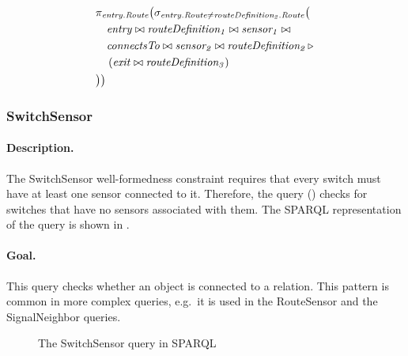 \begin{align*}
& \pi_{\mathit{entry.Route}} \big( \sigma_{\mathit{entry.Route} \neq \mathit{routeDefinition_2.Route}} \big( \\
& \quad \mathit{entry} \bowtie \mathit{routeDefinition_1} \bowtie \mathit{sensor_1} \bowtie \\
& \quad \mathit{connectsTo} \bowtie \mathit{sensor_2} \bowtie \mathit{routeDefinition_2} \, \triangleright \, \\
& \quad \left( \mathit{exit} \bowtie \mathit{routeDefinition_3} \right) \\
& \big) \big)
\end{align*}

\subsubsection{SwitchSensor}

\paragraph{Description.} The \textsf{SwitchSensor} well-formedness constraint requires that every switch must have at least one sensor connected to it. Therefore, the query () checks for switches that have no sensors associated with them. The SPARQL representation of the query is shown in .

\paragraph{Goal.} This query checks whether an object is connected to a relation. This pattern is common in more complex queries, e.g.\ it is used in the \textsf{RouteSensor} and the \textsf{SignalNeighbor} queries.

\begin{figure}[Htb]
\centering
\begin{minipage}{0.6\textwidth}
  { \alignListing
    }
  \caption{The \textsf{SwitchSensor} query in SPARQL}
  \label{lst:switchsensor-sparql}
\end{minipage}
\end{figure}

% 
% 


